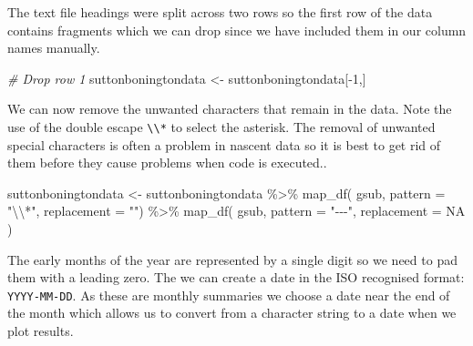 \documentclass{article}
\newenvironment{Shaded}{\begin{snugshade}}{\end{snugshade}}
\newcommand{\AttributeTok}[1]{\textcolor[rgb]{0.77,0.63,0.00}{#1}}
\newcommand{\CommentTok}[1]{\textcolor[rgb]{0.56,0.35,0.01}{\textit{#1}}}
\newcommand{\ConstantTok}[1]{\textcolor[rgb]{0.00,0.00,0.00}{#1}}
\newcommand{\DecValTok}[1]{\textcolor[rgb]{0.00,0.00,0.81}{#1}}
\newcommand{\FunctionTok}[1]{\textcolor[rgb]{0.00,0.00,0.00}{#1}}
\newcommand{\NormalTok}[1]{#1}
\newcommand{\OtherTok}[1]{\textcolor[rgb]{0.56,0.35,0.01}{#1}}
\newcommand{\SpecialCharTok}[1]{\textcolor[rgb]{0.00,0.00,0.00}{#1}}
\newcommand{\StringTok}[1]{\textcolor[rgb]{0.31,0.60,0.02}{#1}}
\begin{document}
The text file headings were split across two rows so the first row of the data contains fragments which we can drop since we have included them in our column names manually.

\begin{Shaded}
\begin{Highlighting}[]
\CommentTok{\# Drop row 1}
\NormalTok{suttonboningtondata }\OtherTok{\textless{}{-}}\NormalTok{ suttonboningtondata[}\SpecialCharTok{{-}}\DecValTok{1}\NormalTok{,]}
\end{Highlighting}
\end{Shaded}

We can now remove the unwanted characters that remain in the data. Note the use of the double escape \texttt{\textbackslash{}\textbackslash{}*} to select the asterisk. The removal of unwanted special characters is often a problem in nascent data so it is best to get rid of them before they cause problems when code is executed..

\begin{Shaded}
\begin{Highlighting}[]
\NormalTok{suttonboningtondata }\OtherTok{\textless{}{-}}\NormalTok{ suttonboningtondata }\SpecialCharTok{\%\textgreater{}\%}
                        \FunctionTok{map\_df}\NormalTok{( gsub,}
                                \AttributeTok{pattern =} \StringTok{"}\SpecialCharTok{\textbackslash{}\textbackslash{}}\StringTok{*"}\NormalTok{,}
                                \AttributeTok{replacement =} \StringTok{""}\NormalTok{) }\SpecialCharTok{\%\textgreater{}\%}
                        \FunctionTok{map\_df}\NormalTok{( gsub,}
                                \AttributeTok{pattern =} \StringTok{"{-}{-}{-}"}\NormalTok{,}
                                \AttributeTok{replacement =} \ConstantTok{NA}
\NormalTok{                                )}
\end{Highlighting}
\end{Shaded}

The early months of the year are represented by a single digit so we need to pad them with a leading zero. The we can create a date in the ISO recognised format: \texttt{YYYY-MM-DD}. As these are monthly summaries we choose a date near the end of the month which allows us to convert from a character string to a date when we plot results.
\end{document}
